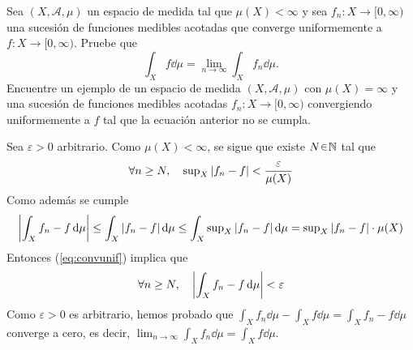 \setcounter{neje}{57}
\begin{nejer}
Sea $(X, \mathcal{A}, \mu)$ un espacio de medida tal que $\mu(X) < \infty$ y sea $f_n\colon X \to [0, \infty)$ una sucesión de funciones medibles acotadas que converge uniformemente a $f\colon X \to [0, \infty)$. Pruebe que
$$
\int_X f \dd{\mu} = \lim_{n \to \infty} \int_X f_n \dd{\mu}.
$$
Encuentre un ejemplo de un espacio de medida $(X, \mathcal{A}, \mu)$ con $\mu(X) = \infty$ y una sucesión de funciones medibles acotadas $f_n\colon X \to [0, \infty)$ convergiendo uniformemente a $f$ tal que la ecuación anterior no se cumpla.
\end{nejer}
\begin{sol}
Sea $\varepsilon>0$ arbitrario. Como $\mu(X) < \infty$, se sigue que existe $N\en \mathbb{N}$ tal que 
\begin{equation}\label{eq:convunif}
\forall n \ge N,
\quad
\sup\nolimits_X\abs{f_n - f} < \frac{\varepsilon}{\mu(X)}
\end{equation}
Como además se cumple
\[
\abs{\int_X f_n-f \dd{\mu}}
\leq \int_X \abs{f_n-f} \dd{\mu}
\leq \int_X \sup\nolimits_X\abs{f_n - f} \dd{\mu}
= \sup\nolimits_X\abs{f_n - f} \cdot \mu(X)
\]
Entonces (\ref{eq:convunif}) implica que 
\[
\forall n \ge N,
\quad
\abs{\int_X f_n -f \dd{\mu}} < \varepsilon
\]
Como $\varepsilon > 0$ es arbitrario, hemos probado que $\int_X f_n \dd{\mu} - \int_X f \dd{\mu} = \int_X f_n-f \dd{\mu}$ converge a cero, es decir, $\lim_{n\to\infty} \int_X f_n \dd{\mu} = \int_X f \dd{\mu}$.

\end{sol}
